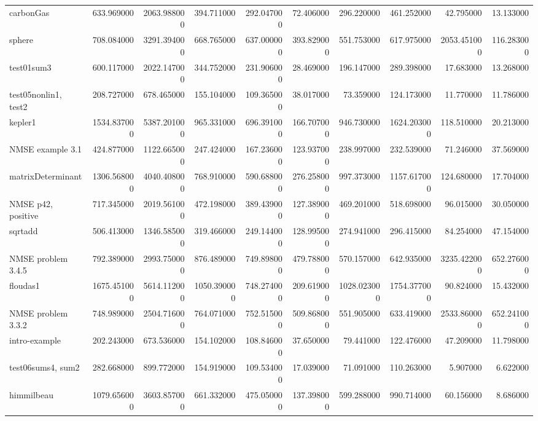 \begin{longtable}{lrrrrrrrrr}
carbonGas & 633.969000 & 2063.988000 & 394.711000 & 292.047000 & 72.406000 & 296.220000 & 461.252000 & 42.795000 & 13.133000 \\
sphere & 708.084000 & 3291.394000 & 668.765000 & 637.000000 & 393.829000 & 551.753000 & 617.975000 & 2053.451000 & 116.283000 \\
test01sum3 & 600.117000 & 2022.147000 & 344.752000 & 231.906000 & 28.469000 & 196.147000 & 289.398000 & 17.683000 & 13.268000 \\
test05nonlin1, test2 & 208.727000 & 678.465000 & 155.104000 & 109.365000 & 38.017000 & 73.359000 & 124.173000 & 11.770000 & 11.786000 \\
kepler1 & 1534.837000 & 5387.201000 & 965.331000 & 696.391000 & 166.707000 & 946.730000 & 1624.203000 & 118.510000 & 20.213000 \\
NMSE example 3.1 & 424.877000 & 1122.665000 & 247.424000 & 167.236000 & 123.937000 & 238.997000 & 232.539000 & 71.246000 & 37.569000 \\
matrixDeterminant & 1306.568000 & 4040.408000 & 768.910000 & 590.688000 & 276.258000 & 997.373000 & 1157.617000 & 124.680000 & 17.704000 \\
NMSE p42, positive & 717.345000 & 2019.561000 & 472.198000 & 389.439000 & 127.389000 & 469.201000 & 518.698000 & 96.015000 & 30.050000 \\
sqrtadd & 506.413000 & 1346.585000 & 319.466000 & 249.144000 & 128.995000 & 274.941000 & 296.415000 & 84.254000 & 47.154000 \\
NMSE problem 3.4.5 & 792.389000 & 2993.750000 & 876.489000 & 749.898000 & 479.788000 & 570.157000 & 642.935000 & 3235.422000 & 652.276000 \\
floudas1 & 1675.451000 & 5614.112000 & 1050.390000 & 748.274000 & 209.619000 & 1028.023000 & 1754.377000 & 90.824000 & 15.432000 \\
NMSE problem 3.3.2 & 748.989000 & 2504.716000 & 764.071000 & 752.515000 & 509.868000 & 551.905000 & 633.419000 & 2533.860000 & 652.241000 \\
intro-example & 202.243000 & 673.536000 & 154.102000 & 108.846000 & 37.650000 & 79.441000 & 122.476000 & 47.209000 & 11.798000 \\
test06sums4, sum2 & 282.668000 & 899.772000 & 154.919000 & 109.534000 & 17.039000 & 71.091000 & 110.263000 & 5.907000 & 6.622000 \\
himmilbeau & 1079.656000 & 3603.857000 & 661.332000 & 475.050000 & 137.398000 & 599.288000 & 990.714000 & 60.156000 & 8.686000 \\

\end{longtable}
